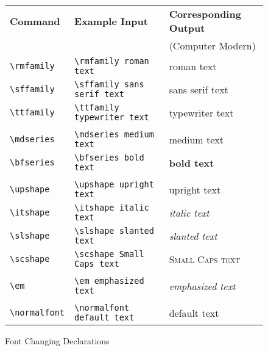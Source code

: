 \documentclass{article}
\begin{document}
\begin{figure}[H]
\caption{Font Changing Declarations}
\label{}
\begin{center}
    \begin{tabular}{l|l l}
    \toprule
    \textbf{Command} & \textbf{Example Input} & \textbf{Corresponding Output} \\
    & & (Computer Modern) \\
    \midrule
    \verb|\rmfamily| & \verb|\rmfamily roman text| & \rmfamily roman text \\
    \verb|\sffamily| & \verb|\sffamily sans serif text| & \sffamily sans serif text \\
    \verb|\ttfamily| & \verb|\ttfamily typewriter text| & \ttfamily typewriter text \\
    & & \\
    \verb|\mdseries| & \verb|\mdseries medium text| & \mdseries medium text \\
    \verb|\bfseries| & \verb|\bfseries bold text| & \bfseries bold text \\
    & & \\
    \verb|\upshape| & \verb|\upshape upright text| & \upshape upright text \\
    \verb|\itshape| & \verb|\itshape italic text| & \itshape italic text \\
    \verb|\slshape| & \verb|\slshape slanted text| & \slshape slanted text \\
    \verb|\scshape| & \verb|\scshape Small Caps text| & \scshape Small Caps text \\
    & & \\
    \verb|\em| & \verb|\em emphasized text| & \em emphasized text \\
    & & \\
    \verb|\normalfont| & \verb|\normalfont default text| & \normalfont default text \\
    \bottomrule
    \end{tabular}
\end{center}
\end{figure}
\end{document}
